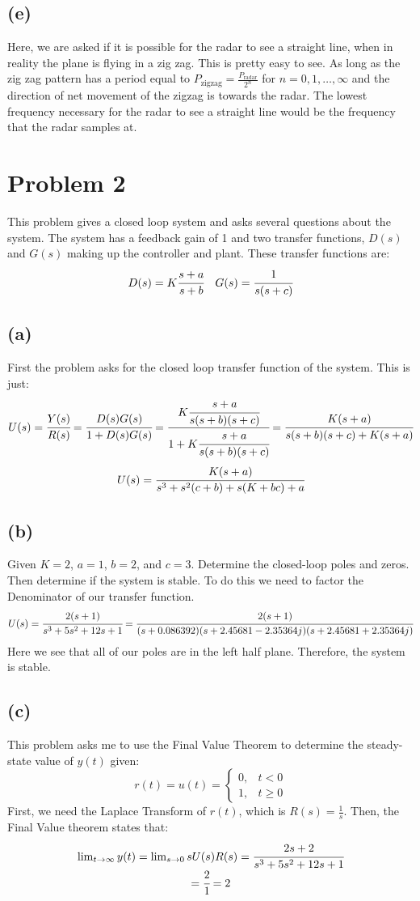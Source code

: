 \documentclass{article}
\begin{document}
\subsection*{(e)}
Here, we are asked if it is possible for the radar to see a straight line, when in reality the plane is flying in a zig zag. This is pretty easy to see. As long as the zig zag pattern has a period equal to $P_{\text{zigzag}}=\frac{P_{\text{radar}}}{2^n}$ for $n=0,1,\dots,\infty$ and the direction of net movement of the zigzag is towards the radar. The lowest frequency necessary for the radar to see a straight line would be the frequency that the radar samples at.


\section*{Problem 2}
This problem gives a closed loop system and asks several questions about the system. The system has a feedback gain of 1 and two transfer functions, $D(s)$ and $G(s)$ making up the controller and plant. These transfer functions are:
\[D(s)=K\cfrac{s+a}{s+b}\quad G(s)=\cfrac{1}{s(s+c)}\]
\subsection*{(a)}
First the problem asks for the closed loop transfer function of the system. This is just:
\[U(s)=\cfrac{Y(s)}{R(s)}=\cfrac{D(s)G(s)}{1+D(s)G(s)}=\cfrac{K\cfrac{s+a}{s(s+b)(s+c)}}{1+K\cfrac{s+a}{s(s+b)(s+c)}}=\cfrac{K(s+a)}{s(s+b)(s+c)+K(s+a)}\]
\[U(s)=\cfrac{K(s+a)}{s^3+s^2(c+b)+s(K+bc)+a}\]

\subsection*{(b)}
Given $K=2$, $a=1$, $b=2$, and $c=3$. Determine the closed-loop poles and zeros. Then determine if the system is stable. To do this we need to factor the Denominator of our transfer function.
\[U(s)=\cfrac{2(s+1)}{s^3+5s^2+12s+1}=\cfrac{2(s+1)}{(s+0.086392)(s+2.45681-2.35364j)(s+2.45681+2.35364j)}\]
Here we see that all of our poles are in the left half plane. Therefore, the system is stable.

\subsection*{(c)}
This problem asks me to use the Final Value Theorem to determine the steady-state value of $y(t)$ given:
\[r(t)=u(t)=\left \{\begin{array}{ll}0, & t<0\\1, & t\geq 0\end{array}\right .\]
First, we need the Laplace Transform of $r(t)$, which is $R(s)=\frac{1}{s}$. Then, the Final Value theorem states that:
\[\begin{array}{c}\lim_{t\to\infty}y(t)=\lim_{s\to 0}sU(s)R(s)=\cfrac{2s+2}{s^3+5s^2+12s+1}\\=\cfrac{2}{1}=2\end{array}\]
\end{document}
